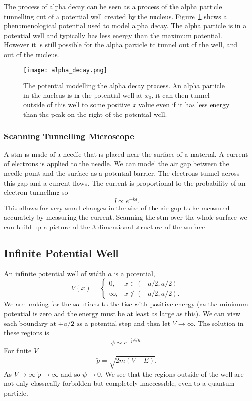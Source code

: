     The process of alpha decay can be seen as a process of the alpha particle tunnelling out of a potential well created by the nucleus.
    Figure~\ref{fig:alpha decay} shows a phenomenological potential used to model alpha decay.
    The alpha particle is in a potential well and typically has less energy than the maximum potential.
    However it is still possible for the alpha particle to tunnel out of the well, and out of the nucleus.
    \begin{figure}[ht]
        \centering
        \texttt{[image: alpha\_decay.png]}
        \caption{The potential modelling the alpha decay process. An alpha particle in the nucleus is in the potential well at \(x_0\), it can then tunnel outside of this well to some positive \(x\) value even if it has less energy than the peak on the right of the potential well.}
        \label{fig:alpha decay}
    \end{figure}

    \subsubsection{Scanning Tunnelling Microscope}
    A \gls{stm} is made of a needle that is placed near the surface of a material.
    A current of electrons is applied to the needle.
    We can model the air gap between the needle point and the surface as a potential barrier.
    The electrons tunnel across this gap and a current flows.
    The current is proportional to the probability of an electron tunnelling so
    \[I \propto e^{-ka}.\]
    This allows for very small changes in the size of the air gap to be measured accurately by measuring the current.
    Scanning the \gls{stm} over the whole surface we can build up a picture of the 3-dimensional structure of the surface.
    
    \subsection{Infinite Potential Well}\label{sec:infinite square well}
    An infinite potential well of width \(a\) is a potential,
    \[
        V(x) =
        \begin{cases}
            0, & x \in(-a/2, a/2)\\
            \infty, & x\notin (-a/2, a/2).
        \end{cases}
    \]
    We are looking for the solutions to the \gls{tise} with positive energy (as the minimum potential is zero and the energy must be at least as large as this).
    We can view each boundary at \(\pm a/2\) as a potential step and then let \(V\to\infty\).
    The solution in these regions is
    \[\psi \sim e^{-\tilde{p}\delta/\hbar}.\]
    For finite \(V\)
    \[\tilde{p} = \sqrt{2m(V - E)}.\]
    As \(V\to\infty\) \(\tilde{p} \to \infty\) and so \(\psi\to 0\).
    We see that the regions outside of the well are not only classically forbidden but completely inaccessible, even to a quantum particle.
    
